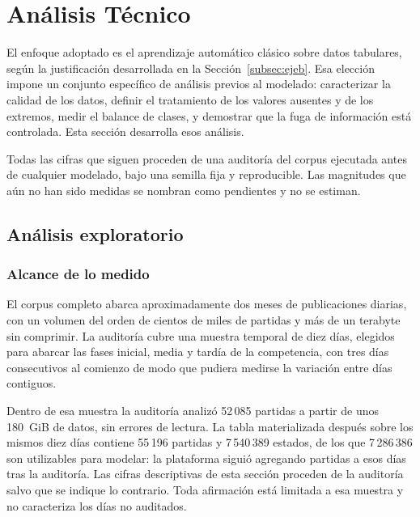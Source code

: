 %
\section{Análisis Técnico}
\label{sec:analisistecnico}

El enfoque adoptado es el aprendizaje automático clásico sobre datos
tabulares, según la justificación desarrollada en la
Sección~\ref{subsec:ejeb}. Esa elección impone un conjunto específico de
análisis previos al modelado: caracterizar la calidad de los datos, definir
el tratamiento de los valores ausentes y de los extremos, medir el balance
de clases, y demostrar que la fuga de información está controlada. Esta
sección desarrolla esos análisis.

Todas las cifras que siguen proceden de una auditoría del corpus ejecutada
antes de cualquier modelado, bajo una semilla fija y reproducible. Las
magnitudes que aún no han sido medidas se nombran como pendientes y no se
estiman.

\subsection{Análisis exploratorio}
\label{subsec:eda}

\subsubsection{Alcance de lo medido}

El corpus completo abarca aproximadamente dos meses de publicaciones
diarias, con un volumen del orden de cientos de miles de partidas y más de
un terabyte sin comprimir. La auditoría cubre una muestra temporal de diez
días, elegidos para abarcar las fases inicial, media y tardía de la
competencia, con tres días consecutivos al comienzo de modo que pudiera
medirse la variación entre días contiguos.

Dentro de esa muestra la auditoría analizó 52\,085 partidas a partir de unos
180~GiB de datos, sin errores de lectura. La tabla materializada después
sobre los mismos diez días contiene 55\,196 partidas y 7\,540\,389 estados,
de los que 7\,286\,386 son utilizables para modelar: la plataforma siguió
agregando partidas a esos días tras la auditoría. Las cifras descriptivas de
esta sección proceden de la auditoría salvo que se indique lo contrario.
Toda afirmación está limitada a esa muestra y no caracteriza los días no
auditados.

